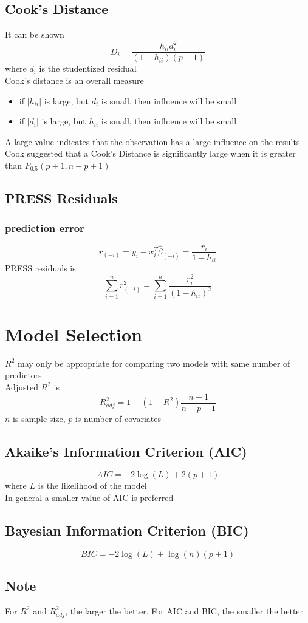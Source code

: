 \documentclass[11pt]{article}
\begin{document}
\subsection{Cook's Distance}
It can be shown 
\[D_i = \frac{h_{ii}d_i^2}{(1-h_{ii})(p+1)}\] 
where $d_i$ is the studentized residual \\
Cook's distance is an overall measure 
\begin{itemize}
    \item if $|h_{ii}|$ is large, but $d_i$ is small, then influence will be small 
    \item if $|d_i|$ is large, but $h_{ii}$ is small, then influence will be small
\end{itemize}
A large value indicates that the observation has a large influence on the results \\
Cook suggested that a Cook's Distance is significantly large when it is greater than $F_{0.5}(p+1,n-p+1)$
\subsection{PRESS Residuals}
\subsubsection*{prediction error}
\[r_{(-i)} = y_i-x_i^T\hat\beta_{(-i)} = \frac{r_i}{1-h_{ii}}\] 
PRESS residuals is 
\[\sum_{i=1}^{n}r_{(-i)}^2 = \sum_{i=1}^{n}\frac{r_i^2}{(1-h_{ii})^2}\]

\section{Model Selection}
$R^2$ may only be appropriate for comparing two models with same number of predictors \\
Adjusted $R^2$ is
\[R^2_{adj} = 1-(1-R^2)\frac{n-1}{n-p-1}\]
$n$ is sample size, $p$ is number of covariates 
\subsection{Akaike's Information Criterion (AIC)}
\[AIC = -2\log(L)+2(p+1)\]
where $L$ is the likelihood of the model \\
In general a smaller value of AIC is preferred 
\subsection{Bayesian Information Criterion (BIC)}
\[BIC = -2\log(L)+\log(n)(p+1)\]
\subsection{Note}
For $R^2$ and $R^2_{adj}$, the larger the better. For AIC and BIC, the smaller the better 
\end{document}
